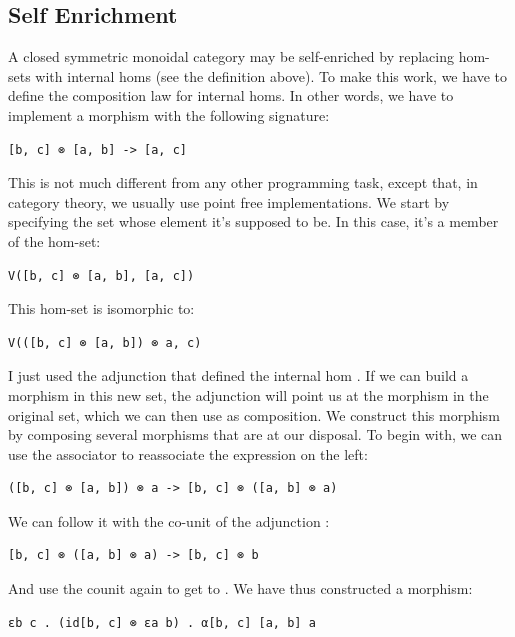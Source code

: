 \subsection{Self Enrichment}\label{self-enrichment}

A closed symmetric monoidal category may be self-enriched by replacing
hom-sets with internal homs (see the definition above). To make this
work, we have to define the composition law for internal homs. In other
words, we have to implement a morphism with the following signature:

\begin{verbatim}
[b, c] ⊗ [a, b] -> [a, c]
\end{verbatim}

This is not much different from any other programming task, except that,
in category theory, we usually use point free implementations. We start
by specifying the set whose element it's supposed to be. In this case,
it's a member of the hom-set:

\begin{verbatim}
V([b, c] ⊗ [a, b], [a, c])
\end{verbatim}

This hom-set is isomorphic to:

\begin{verbatim}
V(([b, c] ⊗ [a, b]) ⊗ a, c)
\end{verbatim}

I just used the adjunction that defined the internal hom
\code{{[}a,\ c{]}}. If we can build a morphism in this new set, the
adjunction will point us at the morphism in the original set, which we
can then use as composition. We construct this morphism by composing
several morphisms that are at our disposal. To begin with, we can use
the associator  to reassociate the
expression on the left:

\begin{verbatim}
([b, c] ⊗ [a, b]) ⊗ a -> [b, c] ⊗ ([a, b] ⊗ a)
\end{verbatim}

We can follow it with the co-unit of the adjunction :

\begin{verbatim}
[b, c] ⊗ ([a, b] ⊗ a) -> [b, c] ⊗ b
\end{verbatim}

And use the counit  again to get to . We have
thus constructed a morphism:

\begin{verbatim}
εb c . (id[b, c] ⊗ εa b) . α[b, c] [a, b] a
\end{verbatim}

